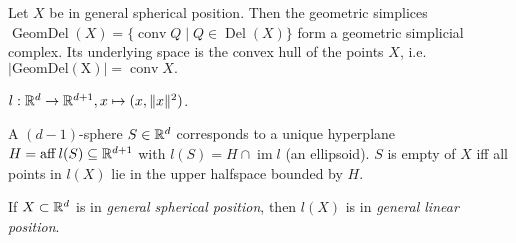 \begin{multicols*}{3}
\begin{definition}
\end{definition}
\rspace
\begin{theorem}
Let $X$ be in {general spherical position}. Then the  geometric simplices
$\operatorname{GeomDel}(X) = \{\operatorname{conv} Q \mid Q \in \operatorname{Del}(X)\}$
form a geometric simplicial complex. Its underlying space is the convex hull of the points $X$, i.e.
$|\operatorname{GeomDel(X)}| =\operatorname{conv} X.$
\end{theorem}
\rspace \columnbreak
\begin{defi}[Lifting]
$l:\mathbb{R}^d\to \mathbb{R}^{d+1}, x\mapsto (x,\|x\|^2)$.
\end{defi}
\rspace
\begin{lemma}
A $(d-1)$-sphere $S\in \mathbb{R}^d$ corresponds to a unique hyperplane $H= \operatorname{aff} l(S) \subseteq \mathbb{R}^{d+1}$ with $l(S)=H \cap \operatorname{im} l$ (an ellipsoid). $S$ is empty of $X$ iff all points in $l(X)$ lie in the upper halfspace bounded by $H$.
\end{lemma}
\rspace
\begin{cor}
If $X\subset \mathbb{R}^d$ is in \emph{general spherical position}, then $l(X)$ is in \emph{general linear position}.
\end{cor}
\rspace
\drawaline\\\vspace{-0.5pc}

\end{multicols*}
